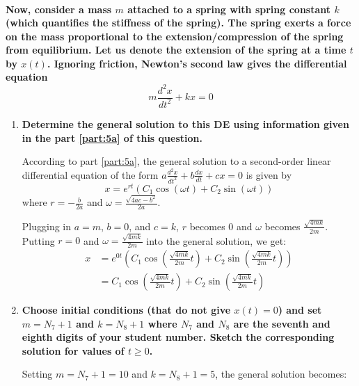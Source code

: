 \documentclass[11pt]{article}
\begin{document}
\begin{enumerate}[label={\textbf{\arabic*.}}]
{\begin{enumerate}[label={\textbf{(\alph*)}}]
{\begin{align*}
                    \end{align*}
                }
            \end{enumerate}
            \textbf{\boldmath Now, consider a mass $m$ attached to a spring with spring constant $k$ (which quantifies the stiffness of the spring). The spring exerts a force on the mass proportional to the extension/compression of the spring from equilibrium. Let us denote the extension of the spring at a time $t$ by $x(t)$. Ignoring friction, Newton's second law gives the differential equation $$m\frac{d^2x}{dt^2}+kx=0$$}
            \begin{enumerate}[label={\textbf{(\alph*)}}, resume]
                \item{
                    \label{part:5b}
                    \textbf{Determine the general solution to this DE using information given in the part \ref{part:5a} of this question.}
                    \par
                    According to part \ref{part:5a}, the general solution to a second-order linear differential equation of the form $a\frac{d^2x}{dt^2}+b\frac{dx}{dt}+cx=0$ is given by $$x=e^{rt}(C_1\cos(\omega t)+C_2\sin(\omega t))$$ where $r=-\frac{b}{2a}$ and $\omega=\frac{\sqrt{4ac-b^2}}{2a}$.
                    \par
                    Plugging in $a=m$, $b=0$, and $c=k$, $r$ becomes 0 and $\omega$ becomes $\frac{\sqrt{4mk}}{2m}$. Putting $r=0$ and $\omega=\frac{\sqrt{4mk}}{2m}$ into the general solution, we get:
                    \begin{align*}
                        x&=e^{0t}\left(C_1\cos\left(\tfrac{\sqrt{4mk}}{2m}t\right)+C_2\sin\left(\tfrac{\sqrt{4mk}}{2m}t\right)\right) \\
                        &=C_1\cos\left(\tfrac{\sqrt{4mk}}{2m}t\right)+C_2\sin\left(\tfrac{\sqrt{4mk}}{2m}t\right)
                    \end{align*}
                }
                \item{
                    \label{part:5c}
                    \textbf{\boldmath Choose initial conditions (that do not give $x(t)=0$) and set $m=N_7+1$ and $k=N_8+1$ where $N_7$ and $N_8$ are the seventh and eighth digits of your student number. Sketch the corresponding solution for values of $t\ge0$.}
                    \par
                    Setting $m=N_7+1=10$ and $k=N_8+1=5$, the general solution becomes:
                    \begin{equation*}

\end{equation*}}
\end{enumerate}}
\end{enumerate}
\end{document}
